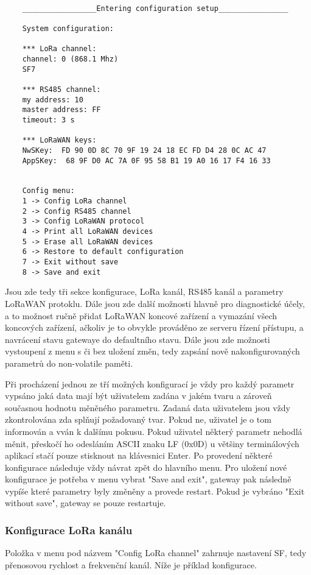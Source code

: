 \newpage
\begin{lstlisting}[style=log]

    _________________Entering configuration setup________________
    
    System configuration:
    
    *** LoRa channel: 
    channel: 0 (868.1 Mhz)
    SF7
    
    *** RS485 channel: 
    my address: 10
    master address: FF
    timeout: 3 s
    
    *** LoRaWAN keys: 
    NwSKey:  FD 90 0D 8C 70 9F 19 24 18 EC FD D4 28 0C AC 47
    AppSKey:  68 9F D0 AC 7A 0F 95 58 B1 19 A0 16 17 F4 16 33
    
    
    Config menu:
    1 -> Config LoRa channel
    2 -> Config RS485 channel
    3 -> Config LoRaWAN protocol
    4 -> Print all LoRaWAN devices
    5 -> Erase all LoRaWAN devices
    6 -> Restore to default configuration
    7 -> Exit without save
    8 -> Save and exit

\end{lstlisting}
    

Jsou zde tedy tři sekce konfigurace, LoRa kanál, RS485 kanál a parametry LoRaWAN protoklu.
Dále jsou zde další možnosti hlavně pro diagnostické účely, a to možnost ručně přidat LoRaWAN koncové zařízení a vymazání všech koncových zařízení, ačkoliv je to obvykle prováděno ze serveru řízení přístupu, a navrácení stavu gatewaye do defaultního stavu. Dále jsou zde možnosti vystoupení z menu s či bez uložení změn, tedy zapsání nově nakonfigurovaných parametrů do non-volatile paměti.

Při procházení jednou ze tří možných konfigurací je vždy pro každý parametr vypsáno jaká data mají být uživatelem zadána v jakém tvaru a zároveň současnou hodnotu měněného parametru. Zadaná data uživatelem jsou vždy zkontrolována zda splňují požadovaný tvar. Pokud ne, uživatel je o tom informován a vván k dalšímu pokusu.
Pokud uživatel některý parametr nehodlá měnit, přeskočí ho odesláním ASCII znaku LF (0x0D) u většiny terminálových aplikací stačí pouze stisknout na klávesnici Enter.
Po provedení některé konfigurace následuje vždy návrat zpět do hlavního menu. Pro uložení nové konfigurace je potřeba v menu vybrat "Save and exit", gateway pak následně vypíše které parametry byly změněny a provede restart. Pokud je vybráno "Exit without save", gateway se pouze restartuje.


\subsubsection{Konfigurace LoRa kanálu}
Položka v menu pod názvem "Config LoRa channel" zahrnuje nastavení SF, tedy přenosovou rychlost a frekvenční kanál. Níže je příklad konfigurace.


